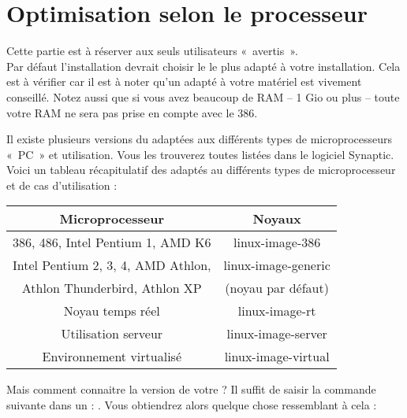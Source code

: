 \section{Optimisation selon le processeur}
Cette partie est à réserver aux seuls utilisateurs «~avertis~».\\
Par défaut l'installation devrait choisir le  le plus adapté à votre installation. Cela est à vérifier car il est à noter qu'un  adapté à votre matériel est vivement conseillé. Notez aussi que si vous avez beaucoup de RAM -- 1 Gio ou plus -- toute votre RAM ne sera pas prise en compte avec le  386.\par
Il existe plusieurs versions du  adaptées aux différents types de microprocesseurs «~PC~» et utilisation. Vous les trouverez toutes listées dans le logiciel Synaptic. Voici un tableau récapitulatif des  adaptés au différents types de microprocesseur et de cas d'utilisation :\par
\renewcommand{\multirowsetup}{\centering}
\begin{center}
\begin{tabular}{||c|c||}
\hline
\hline
Microprocesseur & Noyaux\\
\hline
\hline
386, 486, Intel Pentium 1, AMD K6 & linux-image-386\\
\hline
Intel Pentium 2, 3, 4, AMD Athlon,& linux-image-generic\\
Athlon Thunderbird, Athlon XP & (noyau par défaut)\\
\hline
Noyau temps réel & linux-image-rt\\
\hline
Utilisation serveur & linux-image-server\\
\hline
Environnement virtualisé & linux-image-virtual\\
\hline
\hline
\end{tabular}
\end{center}\par
Mais comment connaitre la version de votre  ? Il suffit de saisir la commande suivante dans un  : . Vous obtiendrez alors quelque chose ressemblant à cela : 
